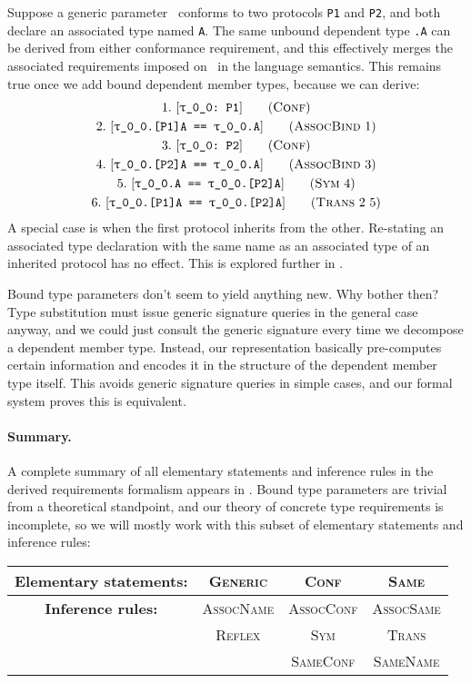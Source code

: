 \documentclass[../generics]{subfiles}
\begin{document}
Suppose a generic parameter \rT\ conforms to two protocols \texttt{P1} and \texttt{P2}, and both declare an associated type named \texttt{A}. The same unbound dependent type \texttt{\rT.A} can be derived from either conformance requirement, and this effectively merges the associated requirements imposed on \nA\ in the language semantics. This remains true once we add bound dependent member types, because we can derive:
\begin{gather*}
\ConfStep{\rT}{P1}{1}\\
\AssocBindStep{1}{\rT.[P1]A}{\rT.A}{2}\\
\ConfStep{\rT}{P2}{3}\\
\AssocBindStep{3}{\rT.[P2]A}{\rT.A}{4}\\
\SymStep{4}{\rT.A}{\rT.[P2]A}{5}\\
\TransStep{2}{5}{\rT.[P1]A}{\rT.[P2]A}{6}
\end{gather*}
A special case is when the first protocol inherits from the other. Re-stating an associated type declaration with the same name as an associated type of an inherited protocol has no effect. This is explored further in .

Bound type parameters don't seem to yield anything new. Why bother then? Type substitution must issue generic signature queries in the general case anyway, and we could just consult the generic signature every time we decompose a dependent member type. Instead, our representation basically pre-computes certain information and encodes it in the structure of the dependent member type itself. This avoids generic signature queries in simple cases, and our formal system proves this is equivalent. 

\paragraph{Summary.}
A complete summary of all elementary statements and inference rules in the derived requirements formalism appears in . Bound type parameters are trivial from a theoretical standpoint, and our theory of concrete type requirements is incomplete, so we will mostly work with this subset of elementary statements and inference rules:
\begin{center}
\begin{tabular}{cccc}
\toprule
\textbf{Elementary statements:}&\textsc{Generic}&\textsc{Conf}&\textsc{Same}\\
\midrule
\textbf{Inference rules:}&\textsc{AssocName}&\textsc{AssocConf}&\textsc{AssocSame}\\
&\textsc{Reflex}&\textsc{Sym}&\textsc{Trans}\\
&&\textsc{SameConf}&\textsc{SameName}\\
\bottomrule
\end{tabular}
\end{center}
\end{document}
